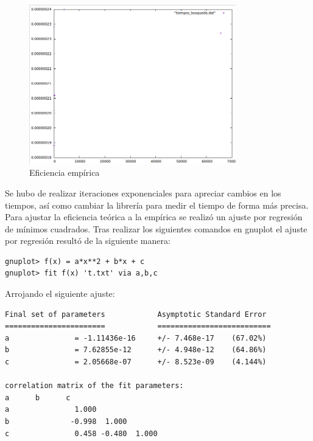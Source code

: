 \documentclass[paper=a4, fontsize=10pt]{scrartcl} %
\begin{document}
\begin{figure}[H] %
	\centering
	\label{lsblk}
	\includegraphics[width=0.8\textwidth]{../imgs/ejercicio3b.PNG}
	\caption{Eficiencia empírica} 
\end{figure}

Se hubo de realizar iteraciones exponenciales para apreciar cambios en los tiempos, así como cambiar la librería para medir el tiempo de forma más precisa.
Para ajustar la eficiencia teórica a la empírica se realizó un ajuste por regresión de mínimos cuadrados. Tras realizar los siguientes comandos en gnuplot el ajuste por regresión resultó de la siguiente manera:

\begin{lstlisting}
gnuplot> f(x) = a*x**2 + b*x + c
gnuplot> fit f(x) 't.txt' via a,b,c
\end{lstlisting}

Arrojando el siguiente ajuste:

\begin{lstlisting}
Final set of parameters            Asymptotic Standard Error
=======================            ==========================
a               = -1.11436e-16     +/- 7.468e-17    (67.02%)
b               = 7.62855e-12      +/- 4.948e-12    (64.86%)
c               = 2.05668e-07      +/- 8.523e-09    (4.144%)

correlation matrix of the fit parameters:
a      b      c      
a               1.000 
b              -0.998  1.000 
c               0.458 -0.480  1.000 
\end{lstlisting}
\end{document}
